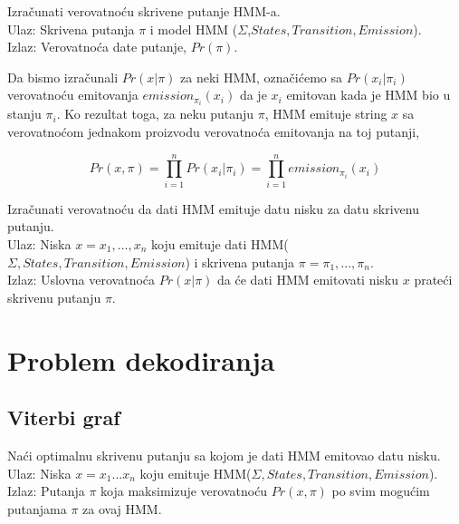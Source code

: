 \begin{problem}
	Izračunati verovatnoću skrivene putanje HMM-a.\\
	Ulaz: Skrivena putanja $ \pi $ i model HMM ($ \Sigma $,$ States,Transition,Emission $). \\
	Izlaz: Verovatnoća date putanje, $ Pr(\pi) $.
\end{problem}

Da bismo izračunali $ Pr(x|\pi) $ za neki HMM, označićemo sa $ Pr(x_i|\pi_i) $ verovatnoću emitovanja $ emission_{\pi_i}(x_i) $ da je $ x_i $ emitovan kada je HMM bio u stanju $ \pi_i $. Ko rezultat toga, za neku putanju $ \pi $, HMM emituje string $ x $ sa verovatnoćom jednakom proizvodu verovatnoća emitovanja na toj putanji,

\begin{equation}
    Pr(x, \pi) = {\displaystyle \prod_{i=1}^n Pr(x_i|\pi_i)} = {\displaystyle \prod_{i=1}^n emission_{\pi_i}(x_i)}    
\end{equation}

\begin{problem}
	Izračunati verovatnoću da dati HMM emituje datu nisku za datu skrivenu putanju.\\
	Ulaz:  Niska $ x=x_1, ..., x_n $ koju emituje dati HMM($ \Sigma, States, Transition, Emission $) i skrivena putanja $ \pi = \pi_1, ..., \pi_n. $\\
	Izlaz:  Uslovna verovatnoća $ Pr(x|\pi) $ da će dati HMM emitovati nisku $ x $ prateći skrivenu putanju $ \pi $.
\end{problem}

\section{Problem dekodiranja}
\subsection{Viterbi graf}

\begin{problem}
    Naći optimalnu skrivenu putanju sa kojom je dati HMM emitovao datu nisku.\\
    Ulaz: Niska $ x = x_1 . . . x_n $ koju emituje HMM($ \Sigma, States, Transition, Emission $).\\ 
    Izlaz: Putanja $ \pi $ koja maksimizuje verovatnoću $ Pr(x,\pi) $ po svim mogućim putanjama $ \pi $ za ovaj HMM.    
\end{problem}

